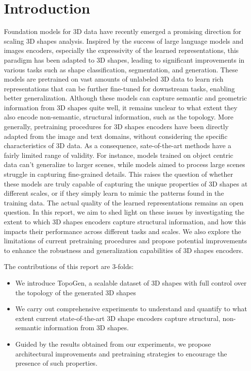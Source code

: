 \section{Introduction}
\label{sec:intro}


Foundation models for 3D data have recently emerged a promising direction for scaling 3D shapes analysis. Inspired by the success of large language models and images encoders, especially the expressivity of the learned representations, this paradigm has been adapted to 3D shapes, leading to significant improvements in various tasks such as shape classification, segmentation, and generation. These models are pretrained on vast amounts of unlabeled 3D data to learn rich representations that can be further fine-tuned for downstream tasks, enabling better generalization. Although these models can capture semantic and geometric information from 3D shapes quite well, it remains unclear to what extent they also encode non-semantic, structural information, such as the topology. More generally, pretraining procedures for 3D shapes encoders have been directly adapted from the image and text domains, without considering the specific characteristics of 3D data. As a consequence, sate-of-the-art methods have a fairly limited range of validity. For instance, models trained on object centric data can't generalize to larger scenes, while models aimed to process large scenes struggle in capturing fine-grained details. This raises the question of whether these models are truly capable of capturing the unique properties of 3D shapes at different scales, or if they simply learn to mimic the patterns found in the training data. The actual quality of the learned representations remains an open question. In this report, we aim to shed light on these issues by investigating the extent to which 3D shapes encoders capture structural information, and how this impacts their performance across different tasks and scales. We also explore the limitations of current pretraining procedures and propose potential improvements to enhance the robustness and generalization capabilities of 3D shapes encoders. 

The contributions of this report are 3-folds:


\begin{itemize}
    \item We introduce TopoGen, a scalable dataset of 3D shapes with full control over the topology of the generated 3D shapes
    \item We carry out comprehensive experiments to understand and quantify to what extent current state-of-the-art 3D shape encoders capture structural, non-semantic information from 3D shapes.
    \item Guided by the results obtained from our experiments, we propose architectural improvements and pretraining strategies to encourage the presence of such properties.
\end{itemize}